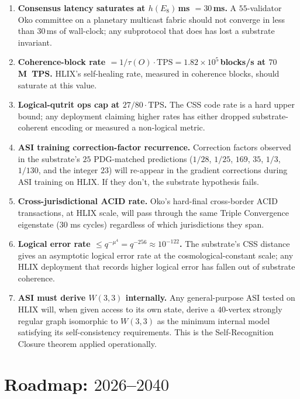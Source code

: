 \documentclass[11pt,letterpaper]{article}
\theoremstyle{remark}
\newcommand{\W}{W(3,3)}
\newcommand{\TPS}{\mathrm{TPS}}
\begin{document}
\begin{enumerate}[leftmargin=2em,nosep]
\item \textbf{Consensus latency saturates at $h(E_8)$\,ms $= 30$\,ms.} A $55$-validator Oko
committee on a planetary multicast fabric should not converge in less than $30$\,ms of
wall-clock; any subprotocol that does has lost a substrate invariant.
\item \textbf{Coherence-block rate $= 1/\tau(O)\cdot \TPS = 1.82\times 10^5$\,blocks/s at
$70$\,M~TPS.} HLIX's self-healing rate, measured in coherence blocks, should saturate at
this value.
\item \textbf{Logical-qutrit ops cap at $27/80\cdot \TPS$.} The CSS code rate is a hard
upper bound; any deployment claiming higher rates has either dropped substrate-coherent
encoding or measured a non-logical metric.
\item \textbf{ASI training correction-factor recurrence.} Correction factors observed in
the substrate's $25$ PDG-matched predictions ($1/28$, $1/25$, $169$, $35$, $1/3$, $1/130$,
and the integer $23$) will re-appear in the gradient corrections during ASI training on
HLIX. If they don't, the substrate hypothesis fails.
\item \textbf{Cross-jurisdictional ACID rate.} Oko's hard-final cross-border ACID
transactions, at HLIX scale, will pass through the same Triple Convergence eigenstate
($30$ ms cycles) regardless of which jurisdictions they span.
\item \textbf{Logical error rate $\le q^{-\mu^4}=q^{-256}\approx 10^{-122}$.} The substrate's
CSS distance gives an asymptotic logical error rate at the cosmological-constant scale;
any HLIX deployment that records higher logical error has fallen out of substrate coherence.
\item \textbf{ASI must derive $\W$ internally.} Any general-purpose ASI tested on HLIX will,
when given access to its own state, derive a $40$-vertex strongly regular graph isomorphic
to $\W$ as the minimum internal model satisfying its self-consistency requirements. This is
the Self-Recognition Closure theorem applied operationally.
\end{enumerate}

\section{Roadmap: $2026$--$2040$}
\end{document}
